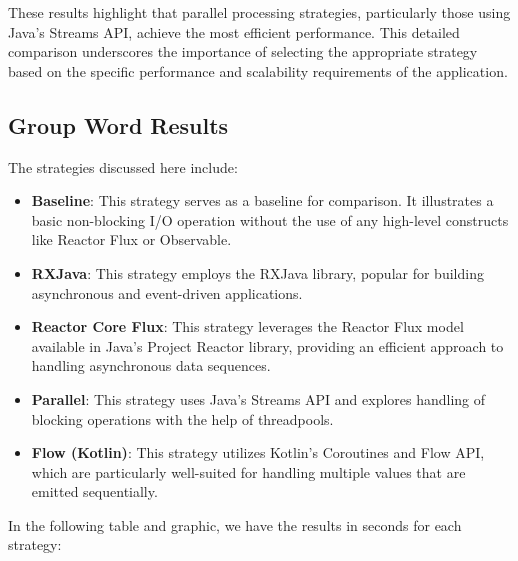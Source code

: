 These results highlight that parallel processing strategies, particularly those using Java's Streams API, achieve the most efficient performance. This detailed comparison underscores the importance of selecting the appropriate strategy based on the specific performance and scalability requirements of the application.
   
\clearpage

    \subsection{Group Word Results}
    \label{subsubsec:group_word_results}
    
   The strategies discussed here include:

    \begin{itemize}
        \item \textbf{Baseline}: This strategy serves as a baseline for comparison. It illustrates a basic non-blocking I/O operation without the use of any high-level constructs like Reactor Flux or Observable.
        \item \textbf{RXJava}: This strategy employs the RXJava library, popular for building asynchronous and event-driven applications.
        \item \textbf{Reactor Core Flux}: This strategy leverages the Reactor Flux model available in Java's Project Reactor library, providing an efficient approach to handling asynchronous data sequences.
        \item \textbf{Parallel}: This strategy uses Java's Streams API and explores handling of blocking operations with the help of threadpools.
        \item \textbf{Flow (Kotlin)}: This strategy utilizes Kotlin's Coroutines and Flow API, which are particularly well-suited for handling multiple values that are emitted sequentially.
    \end{itemize}

    In the following table and graphic, we have the results in seconds for each strategy:


